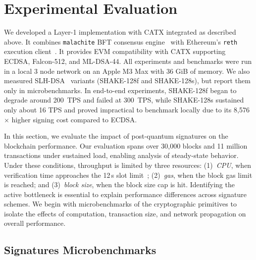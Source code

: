 \section{Experimental Evaluation}\label{s:experiments}

We developed a Layer-1 implementation with CATX integrated as described above. 
It combines \texttt{malachite} BFT consensus engine~\cite{malachite_repo} with Ethereum's \texttt{reth} execution client~\cite{reth_repo}.
It provides EVM compatibility with CATX supporting ECDSA, Falcon-512, and ML-DSA-44.
All experiments and benchmarks were run in a local 3 node network on an Apple M3 Max with 36 GiB of memory. 
We also measured SLH-DSA~\cite{NIST:24SLH} variants (SHAKE-128f and SHAKE-128s), but report them only in microbenchmarks. In end-to-end experiments, SHAKE-128f began to degrade around 200~TPS and failed at 300~TPS, while SHAKE-128s sustained only about 16 TPS and proved impractical to benchmark locally due to its 8{,}576$\times$ higher signing cost compared to ECDSA.

In this section, we evaluate the impact of post-quantum signatures on the blockchain performance. 
Our evaluation spans over 30{,}000 blocks and 11 million transactions under sustained load, enabling analysis of steady-state behavior. 
Under these conditions, throughput is limited by three resources: (1)~\emph{CPU}, when verification time approaches the 12\,s slot limit~\cite{ETH:W14}; (2)~\emph{gas}, when the block gas limit is reached; and (3)~\emph{block size}, when the block size cap is hit. 
Identifying the active bottleneck is essential to explain performance differences across signature schemes. 
We begin with microbenchmarks of the cryptographic primitives to isolate the effects of computation, transaction size, and network propagation on overall performance.


\subsection{Signatures Microbenchmarks}\label{subsec:crypto-primitives}

